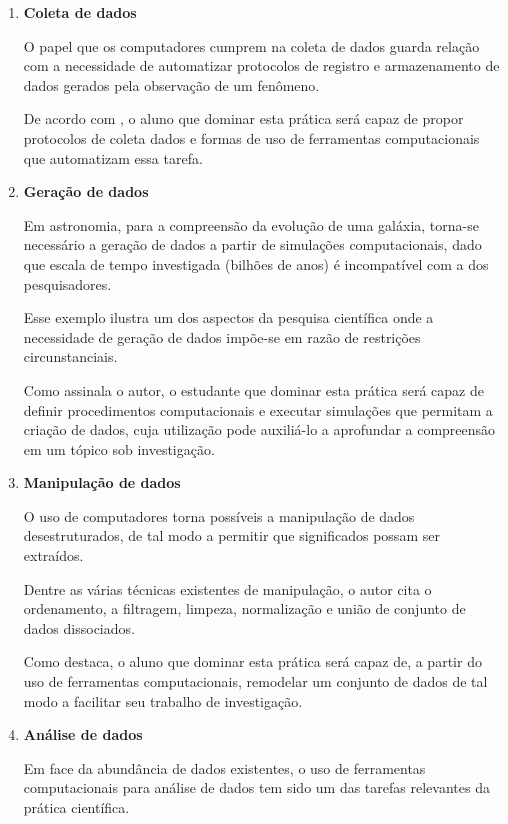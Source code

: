 \begin{enumerate}
  \item \textbf{Coleta de dados}

  O papel que os computadores cumprem na coleta de dados guarda relação com a necessidade de automatizar protocolos de registro e armazenamento de dados gerados pela observação de um fenômeno.
  
  De acordo com , o aluno que dominar esta prática será capaz de propor  protocolos de coleta dados e formas de uso de ferramentas computacionais que automatizam essa tarefa.

  \item \textbf{Geração de dados}
  
  Em astronomia, para a compreensão da evolução de uma galáxia, torna-se necessário a geração de dados a partir de simulações computacionais, dado que escala de tempo investigada (bilhões de anos) é incompatível com a dos pesquisadores.

  Esse exemplo ilustra um dos aspectos da pesquisa científica onde a necessidade de geração de dados impõe-se em razão de restrições circunstanciais.

  Como assinala o autor, o estudante que dominar esta prática será capaz de definir procedimentos computacionais e executar simulações que permitam a criação de dados, cuja utilização pode auxiliá-lo a aprofundar a compreensão em um tópico sob investigação.

  \item \textbf{Manipulação de dados}

  O uso de computadores torna possíveis a manipulação de dados desestruturados, de tal modo a permitir que significados possam  ser extraídos. 

  Dentre as várias técnicas existentes de manipulação, o autor cita o ordenamento, a filtragem, limpeza, normalização e união de conjunto de dados dissociados. 
  
  Como destaca, o aluno que dominar esta prática será capaz de, a partir do uso de ferramentas computacionais, remodelar um conjunto de dados de tal modo a facilitar seu trabalho de investigação.

  \item \textbf{Análise de dados}

  Em face da abundância de dados existentes, o uso de ferramentas computacionais para análise de dados tem sido um das tarefas relevantes da prática científica.   
  

\end{enumerate}
